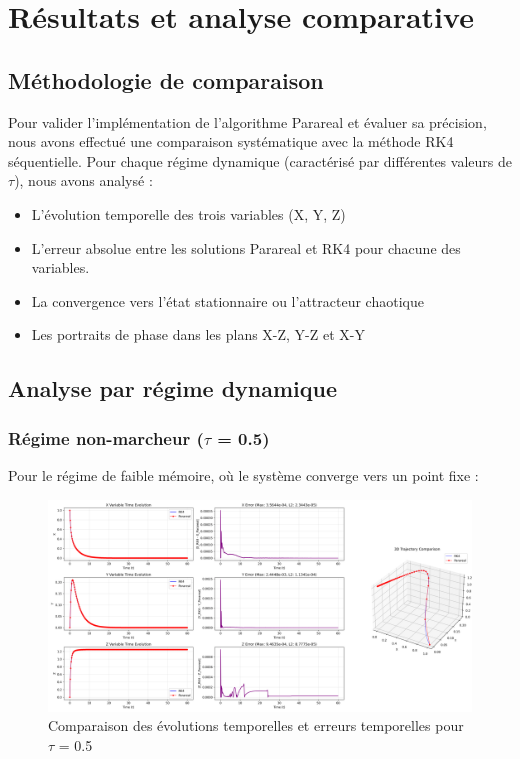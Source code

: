 \section{Résultats et analyse comparative}

\subsection{Méthodologie de comparaison}
Pour valider l'implémentation de l'algorithme Parareal et évaluer sa précision, nous avons effectué une comparaison systématique avec la méthode RK4 séquentielle. Pour chaque régime dynamique (caractérisé par différentes valeurs de $\tau$), nous avons analysé :
\begin{itemize}
    \item L'évolution temporelle des trois variables (X, Y, Z)
    \item L'erreur absolue entre les solutions Parareal et RK4 pour chacune des variables.
    \item La convergence vers l'état stationnaire ou l'attracteur chaotique
    \item Les portraits de phase dans les plans X-Z, Y-Z et X-Y
\end{itemize}

\subsection{Analyse par régime dynamique}

\subsubsection{Régime non-marcheur ($\tau$ = 0.5)}
Pour le régime de faible mémoire, où le système converge vers un point fixe :

\begin{figure}[H]
    \centering
    \includegraphics[width=\textwidth]{figures/comparisons/comparison_tau0.5_comparison}
    \caption{Comparaison des évolutions temporelles et erreurs temporelles pour $\tau$ = 0.5}
    \label{fig:comp_tau0.5_time}
\end{figure}

